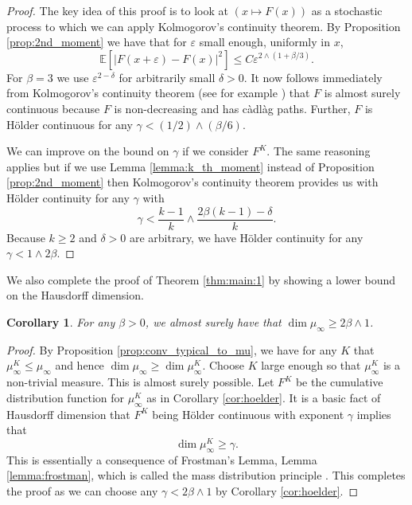 \documentclass{article}
\newtheorem{cor}[thm]{Corollary}
\theoremstyle{definition}
\numberwithin{equation}{section}
\numberwithin{thm}{section}
\newcommand*{\eps}{\ensuremath{\varepsilon}}            %
\newcommand*{\EE}{\ensuremath{\mathbb{E}}}	        	%
\begin{document}
\begin{proof}
    The key idea of this proof is to look at $(x\mapsto F(x))$ as {a} stochastic process to which we can apply Kolmogorov's continuity theorem. By Proposition \ref{prop:2nd_moment} we have {that} for $\eps$ small enough, uniformly in $x$,
    \begin{equation*}
        \EE\left[\vert F(x+\eps)-F(x)\vert^2 \right] \leq C\eps^{2\wedge (1+\beta/3)}.
    \end{equation*}
    For $\beta=3$ we use $\eps^{2-\delta}$ for arbitrarily small $\delta>0$.
    It now follows immediately from Kolmogorov's continuity theorem (see for example \cite[Theorem 4.23]{Kal2021}) that $F$ is almost surely continuous because $F$ is non-decreasing and has càdlàg paths. Further, $F$ is Hölder continuous for any $\gamma< (1/2)\wedge (\beta/6)$.

    We can improve on the bound on $\gamma$ if we consider $F^K$. The same reasoning applies but if we use Lemma \ref{lemma:k_th_moment} instead of Proposition \ref{prop:2nd_moment} then Kolmogorov's continuity theorem provides us with Hölder continuity for any $\gamma$ with 
    \begin{equation*}
        \gamma < \frac{k-1}{k} \wedge \frac{2\beta(k-1)-\delta}{k}.
    \end{equation*}
    Because $k\geq 2$ and $\delta>0$ are arbitrary, we have Hölder continuity for any $\gamma < 1\wedge 2\beta$.
\end{proof}

We also complete the proof of Theorem \ref{thm:main:1} by showing a lower bound on the Hausdorff dimension.

\begin{cor}
    For any $\beta>0$, we almost surely have that $\dim \mu_\infty \geq 2\beta \wedge 1$.
\end{cor}

\begin{proof}
    By Proposition \ref{prop:conv_typical_to_mu}, we have for any $K$ that $\mu^K_\infty \leq \mu_\infty$ and hence $\dim \mu_\infty \geq \dim  \mu_\infty^K.$
    Choose $K$ large enough so that $\mu_\infty^K$ is a non-trivial measure. This is almost surely possible. Let $F^K$ be the cumulative distribution function for $\mu_\infty^K$ as in Corollary \ref{cor:hoelder}. It is a basic fact of Hausdorff dimension that $F^K$ being Hölder continuous with exponent $\gamma$ implies that 
    \begin{equation*}
        \dim  \mu_\infty^K \geq \gamma.
    \end{equation*}
    This is essentially a consequence of Frostman's Lemma, Lemma \ref{lemma:frostman}, {which} is called the mass distribution principle \cite[Principle 4.2]{falconer_fractal_2014}. This completes the proof as we can choose any $\gamma < 2\beta \wedge 1$ by Corollary \ref{cor:hoelder}.
\end{proof}
\end{document}

